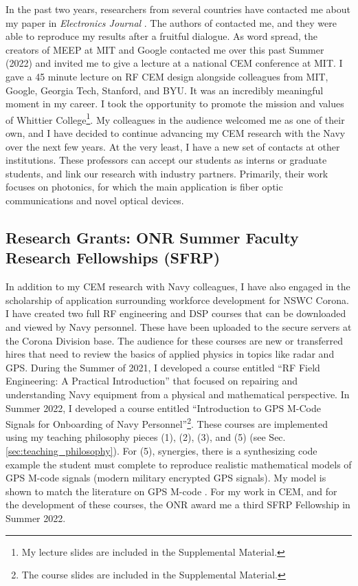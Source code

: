 \documentclass[../../../main.tex]{subfiles}
\begin{document}
In the past two years, researchers from several countries have contacted me about my paper in \textit{Electronics Journal}  \cite{electronics10040415}.  The authors of \cite{10.3390/electronics8121506} contacted me, and they were able to reproduce my results after a fruitful dialogue.  As word spread, the creators of MEEP at MIT and Google contacted me over this past Summer (2022) and invited me to give a lecture at a national CEM conference at MIT.  I gave a 45 minute lecture on RF CEM design alongside colleagues from MIT, Google, Georgia Tech, Stanford, and BYU.  It was an incredibly meaningful moment in my career.  I took the opportunity to promote the mission and values of Whittier College\footnote{My lecture slides are included in the Supplemental Material.}.  My colleagues in the audience welcomed me as one of their own, and I have decided to continue advancing my CEM research with the Navy over the next few years.  At the very least, I have a new set of contacts at other institutions.  These professors can accept our students as interns or graduate students, and link our research with industry partners.  Primarily, their work focuses on photonics, for which the main application is fiber optic communications and novel optical devices.

\subsection{Research Grants: ONR Summer Faculty Research Fellowships (SFRP)}
\label{sec:fellow}

In addition to my CEM research with Navy colleagues, I have also engaged in the scholarship of application surrounding workforce development for NSWC Corona.  I have created two full RF engineering and DSP courses that can be downloaded and viewed by Navy personnel.  These have been uploaded to the secure servers at the Corona Division base.  The audience for these courses are new or transferred hires that need to review the basics of applied physics in topics like radar and GPS.  During the Summer of 2021, I developed a course entitled ``RF Field Engineering: A Practical Introduction'' that focused on repairing and understanding Navy equipment from a physical and mathematical perspective.  In Summer 2022, I developed a course entitled ``Introduction to GPS M-Code Signals for Onboarding of Navy Personnel''\footnote{The course slides are included in the Supplemental Material.}.  These courses are implemented using my teaching philosophy pieces (1), (2), (3), and (5) (see Sec. \ref{sec:teaching_philosophy}).  For (5), synergies, there is a synthesizing code example the student must complete to reproduce realistic mathematical models of GPS M-code signals (modern military encrypted GPS signals).  My model is shown to match the literature on GPS M-code \cite{mcode}.  For my work in CEM, and for the development of these courses, the ONR award me a third SFRP Fellowship in Summer 2022.
\end{document}
